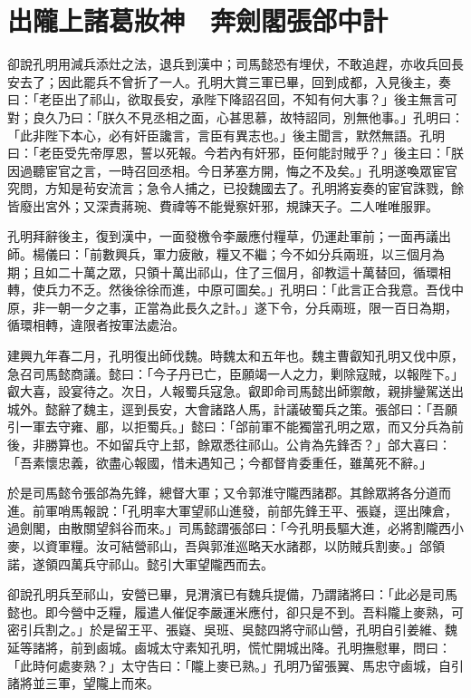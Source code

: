 
\chapter{出隴上諸葛妝神　奔劍閣張郃中計}

卻說孔明用減兵添灶之法，退兵到漢中；司馬懿恐有埋伏，不敢追趕，亦收兵回長安去了；因此罷兵不曾折了一人。孔明大賞三軍已畢，回到成都，入見後主，奏曰：「老臣出了祁山，欲取長安，承陛下降詔召回，不知有何大事？」後主無言可對；良久乃曰：「朕久不見丞相之面，心甚思慕，故特詔同，別無他事。」孔明曰：「此非陛下本心，必有奸臣讒言，言臣有異志也。」後主聞言，默然無語。孔明曰：「老臣受先帝厚恩，誓以死報。今若內有奸邪，臣何能討賊乎？」後主曰：「朕因過聽宦官之言，一時召回丞相。今日茅塞方開，悔之不及矣。」孔明遂喚眾宦官究問，方知是茍安流言；急令人捕之，已投魏國去了。孔明將妄奏的宦官誅戮，餘皆廢出宮外；又深責蔣琬、費禕等不能覺察奸邪，規諫天子。二人唯唯服罪。

孔明拜辭後主，復到漢中，一面發檄令李嚴應付糧草，仍運赴軍前；一面再議出師。楊儀曰：「前數興兵，軍力疲敝，糧又不繼；今不如分兵兩班，以三個月為期；且如二十萬之眾，只領十萬出祁山，住了三個月，卻教這十萬替回，循環相轉，使兵力不乏。然後徐徐而進，中原可圖矣。」孔明曰：「此言正合我意。吾伐中原，非一朝一夕之事，正當為此長久之計。」遂下令，分兵兩班，限一百日為期，循環相轉，違限者按軍法處治。

建興九年春二月，孔明復出師伐魏。時魏太和五年也。魏主曹叡知孔明又伐中原，急召司馬懿商議。懿曰：「今子丹已亡，臣願竭一人之力，剿除寇賊，以報陛下。」叡大喜，設宴待之。次日，人報蜀兵寇急。叡即命司馬懿出師禦敵，親排鑾駕送出城外。懿辭了魏主，逕到長安，大會諸路人馬，計議破蜀兵之策。張郃曰：「吾願引一軍去守雍、郿，以拒蜀兵。」懿曰：「郃前軍不能獨當孔明之眾，而又分兵為前後，非勝算也。不如留兵守上邽，餘眾悉往祁山。公肯為先鋒否？」郃大喜曰：「吾素懷忠義，欲盡心報國，惜未遇知己；今都督肯委重任，雖萬死不辭。」

於是司馬懿令張郃為先鋒，總督大軍；又令郭淮守隴西諸郡。其餘眾將各分道而進。前軍哨馬報說：「孔明率大軍望祁山進發，前部先鋒王平、張嶷，逕出陳倉，過劍閣，由散關望斜谷而來。」司馬懿謂張郃曰：「今孔明長驅大進，必將割隴西小麥，以資軍糧。汝可結營祁山，吾與郭淮巡略天水諸郡，以防賊兵割麥。」郃領諾，遂領四萬兵守祁山。懿引大軍望隴西而去。

卻說孔明兵至祁山，安營已畢，見渭濱已有魏兵提備，乃謂諸將曰：「此必是司馬懿也。即今營中乏糧，履遣人催促李嚴運米應付，卻只是不到。吾料隴上麥熟，可密引兵割之。」於是留王平、張嶷、吳班、吳懿四將守祁山營，孔明自引姜維、魏延等諸將，前到鹵城。鹵城太守素知孔明，慌忙開城出降。孔明撫慰畢，問曰：「此時何處麥熟？」太守告曰：「隴上麥已熟。」孔明乃留張翼、馬忠守鹵城，自引諸將並三軍，望隴上而來。

